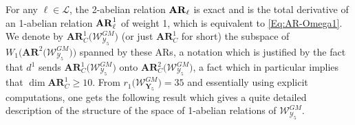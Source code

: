 \documentclass[11pt]{amsart}
\begin{document}
For any $\ell\in \boldsymbol{\mathcal L}$, the 2-abelian relation ${\bf AR}_\ell$ is exact and is the total derivative of an 1-abelian relation  
${\bf AR}_\ell^1$ of weight 1, which is equivalent to \eqref{Eq:AR-Omega1}.  We denote by 
$\boldsymbol{AR}_C^1\big(\boldsymbol{\mathcal W}^{GM}_{ \boldsymbol{\mathcal Y}_5}\big)$ (or just $\boldsymbol{AR}_C^1$ for short) the subspace of 
$W_1\Big( \boldsymbol{AR}^2\big(\boldsymbol{\mathcal W}^{GM}_{ \boldsymbol{\mathcal Y}_5}\big)\Big)$ spanned by these ARs, a notation which is justified by the fact that $d^1$ sends 
$\boldsymbol{AR}_C^1\big(\boldsymbol{\mathcal W}^{GM}_{ \boldsymbol{\mathcal Y}_5}\big)$ onto 
$\boldsymbol{AR}_C^2\big(\boldsymbol{\mathcal W}^{GM}_{ \boldsymbol{\mathcal Y}_5}\big)$, a fact which in particular implies that $\dim \boldsymbol{AR}_C^1\geq 10$. 
From  
$r_1\Big( 
\boldsymbol{\mathcal W}^{GM}_{ \boldsymbol{Y}_5}
\Big)=35$ and essentially using explicit computations, one gets the following result which gives a quite 
detailed description of the structure of the space of 1-abelian relations of $\boldsymbol{\mathcal W}^{GM}_{ \boldsymbol{\mathcal Y}_5}$. 
%
\end{document}
